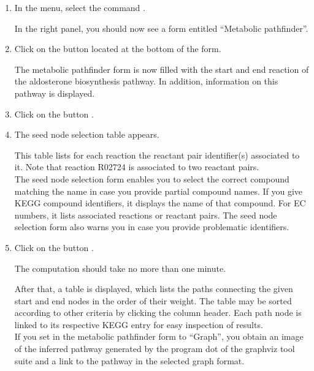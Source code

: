 \begin{enumerate}

\item In the \neat  menu, select the command .

  In the right panel, you should now see a form entitled
  ``Metabolic pathfinder''.

\item Click on the button  located at the bottom of the form.

  The metabolic pathfinder form is now filled with the start and end reaction of the aldosterone biosynthesis pathway.
  In addition, information on this pathway is displayed.

\item Click on the button .

\item The seed node selection table appears.

		This table lists for each reaction the reactant pair identifier(s) associated to it. Note that reaction
		R02724 is associated to two reactant pairs.\\

		The seed node selection form enables you to select the correct compound matching the name
		in case you provide partial compound names.
		If you give KEGG compound identifiers, it displays the name of that compound. For EC numbers, it lists associated
		reactions or reactant pairs.
		The seed node selection form also warns you in case you provide problematic identifiers.

\item Click on the button .

  The computation should take no more than one minute.

  After that, a table is displayed, which lists the paths connecting the given start and end nodes in the order
  of their weight. The table may be sorted according to other criteria by clicking the column header. Each path node
  is linked to its respective KEGG entry for easy inspection of results.\\

  If you set  in the metabolic pathfinder form to ``Graph'', you obtain an image of the inferred
  pathway generated by the program dot of the graphviz tool suite and a link to the pathway in the selected graph format.

\end{enumerate}

